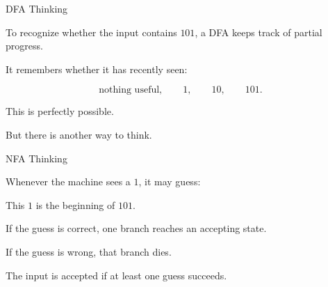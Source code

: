 \documentclass[10pt,aspectratio=169]{beamer}
\begin{document}
\begin{frame}{DFA Thinking}

To recognize whether the input contains \(101\), a DFA keeps track of partial progress.

\vspace{1em}

It remembers whether it has recently seen:

\[
\text{nothing useful},\qquad 1,\qquad 10,\qquad 101.
\]

\vspace{1em}

This is perfectly possible.

\pause

But there is another way to think.

\end{frame}

\begin{frame}{NFA Thinking}

Whenever the machine sees a \(1\), it may guess:

\begin{center}
This \(1\) is the beginning of \(101\).
\end{center}

\vspace{1em}

If the guess is correct, one branch reaches an accepting state.

If the guess is wrong, that branch dies.

\vspace{1em}

\pause
The input is accepted if at least one guess succeeds.

\end{frame}
\end{document}
